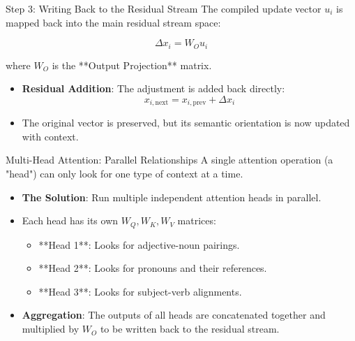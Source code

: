 \documentclass[aspectratio=169]{beamer}
\begin{document}
\begin{frame}{Step 3: Writing Back to the Residual Stream}
  The compiled update vector $u_i$ is mapped back into the main residual stream space:
  
  \[
  \Delta x_i = W_O u_i
  \]
  
  where $W_O$ is the **Output Projection** matrix.
  
  \begin{itemize}
    \item \textbf{Residual Addition}: The adjustment is added back directly:
      \[
      x_{i,\text{next}} = x_{i,\text{prev}} + \Delta x_i
      \]
    \item The original vector is preserved, but its semantic orientation is now updated with context.
  \end{itemize}
\end{frame}

\begin{frame}{Multi-Head Attention: Parallel Relationships}
  A single attention operation (a "head") can only look for one type of context at a time.
  
  \begin{itemize}
    \item \textbf{The Solution}: Run multiple independent attention heads in parallel.
    \item Each head has its own $W_Q, W_K, W_V$ matrices:
      \begin{itemize}
        \item **Head 1**: Looks for adjective-noun pairings.
        \item **Head 2**: Looks for pronouns and their references.
        \item **Head 3**: Looks for subject-verb alignments.
      \end{itemize}
    \item \textbf{Aggregation}: The outputs of all heads are concatenated together and multiplied by $W_O$ to be written back to the residual stream.
  \end{itemize}
\end{frame}
\end{document}
